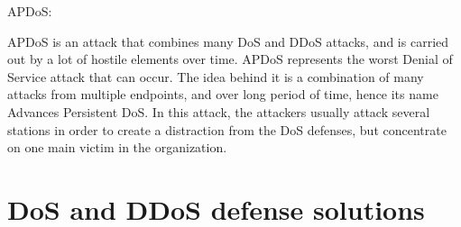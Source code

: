 \documentclass{article}
\begin{document}
 \hfill \break APDoS:

 \hfill \break APDoS is an attack that combines many DoS and DDoS attacks, and is carried out by a lot of hostile elements over time. APDoS represents the worst Denial of Service attack that can occur. The idea behind it is a combination of many attacks from multiple endpoints, and over long period of time, hence its name Advances Persistent DoS. In this attack, the attackers usually attack several stations in order to create a distraction from the DoS defenses, but concentrate on one main victim in the organization.


\section*{DoS and DDoS defense solutions }
\end{document}
